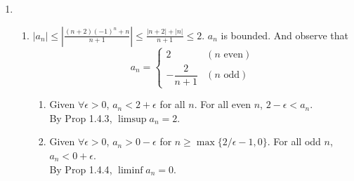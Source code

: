\documentclass[12pt]{report}
\newcommand{\numl}[1]{\item[\large\textbf{\sffamily #1.}]}
\newcommand{\abs}[1]{\left|#1\right|}
\begin{document}
\begin{enumerate}
\numl{6}
\begin{enumerate}
	\item $\abs{a_n} \leq \abs{\frac{(n+2)(-1)^n+n}{n+1}} \leq \frac{\abs{n+2}+\abs{n}}{n+1} \leq 2$. $a_n$ is bounded. And observe that $$a_n = \begin{cases}
		2 & (n \text{ even})\\
		-\dfrac{2}{n+1} & (n \text{ odd})
	\end{cases}$$
	\begin{enumerate}
		\item Given $\forall \epsilon>0$, $a_n < 2 + \epsilon$ for all $n$. For all even $n$, $2-\epsilon < a_n$. \\By \textsf{Prop 1.4.3}, $\limsup a_n = 2$.
		\item Given $\forall \epsilon>0$, $a_n > 0 - \epsilon$ for $n \geq \max\{2/\epsilon - 1, 0\}$. For all odd $n$, $a_n < 0 + \epsilon$. \\
		By \textsf{Prop 1.4.4}, $\liminf a_n = 0$.
	\end{enumerate}


\end{enumerate}
\end{enumerate}
\end{document}
